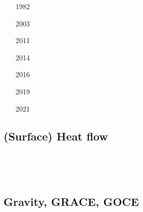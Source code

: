 \begin{scriptsize}
\begin{itemize}
\item[1982]
\textcite{tapl82} 
\item[2003]
\textcite{hukm03} 
\item[2011]
\textcite{seep11} 
\item[2014]
\textcite{capi14} 
\item[2016]
\textcite{capi16} 
\item[2019]
\textcite{sccs19} 
\item[2021]
\textcite{cull21} 
\end{itemize}
\end{scriptsize}



\subsection{(Surface) Heat flow}
\begin{scriptsize}
\begin{itemize}
\item[\nineteensixtyseven] 
\textcite{mcke67} \\
\item[\nineteenninetynine] 
\textcite{dudf99} \\
\item[\twothousandten] 
\textcite{dada10} 
\item[\twothousandtwenty]
\textcite{moku20} 
\end{itemize}
\end{scriptsize}

\subsection{Gravity, GRACE, GOCE}


